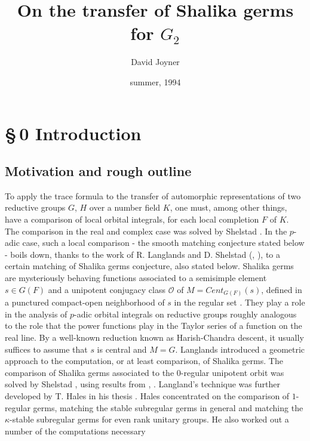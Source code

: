 \documentclass[12pt,letterpaper]{amsart}
\title{On the transfer of Shalika germs for $G_2$}
\author{David Joyner}
\date{summer, 1994}
\begin{document}
\maketitle
\section*{\S\,0 Introduction}

\subsection*{Motivation and rough outline}

To apply the trace formula to the transfer of automorphic representations
of two reductive groups $G$, $H$ over a number field $K$, one must,
among other things, have a comparison of local orbital integrals, for each
local completion $F$ of $K$. The comparison in the real and complex case
was solved by Shelstad \cite{She82}.
In the $p$-adic case, such a local comparison - the smooth matching conjecture
stated below -
boils down, thanks to the work of R. Langlands and D. Shelstad
(\cite{LS87}, \cite{LS90}), to a certain matching of Shalika germs
conjecture, also stated below.
Shalika germs are mysteriously behaving functions
associated to a semisimple element $s\in G(F)$ and a unipotent
conjugacy class ${\mathcal O}$ of $M=Cent_{G(F)}(s)$, defined in a punctured
compact-open neighborhood of $s$ in the regular set \cite{Sh72}. They play a
role in the analysis of $p$-adic orbital integrals on reductive groups
roughly analogous to the role that the power functions play in the Taylor
series of a function on the real line. By a well-known reduction known
as Harish-Chandra descent, it usually suffices to assume that $s$ is central
and $M=G$.
Langlands \cite{La83} introduced a geometric approach to the computation,
or at least comparison, of Shalika germs.
The comparison of Shalika germs associated to the
$0$-regular unipotent orbit was solved by Shelstad \cite{She89},
using results from \cite{LS87}, \cite{LS90}.
Langland's technique was further developed by
T. Hales in his thesis \cite{Ha92a}. Hales concentrated on the comparison of
$1$-regular germs, matching the stable subregular germs in general and
matching the $\kappa$-stable subregular germs for even rank unitary
groups. He also worked out a number of the computations necessary
\end{document}
